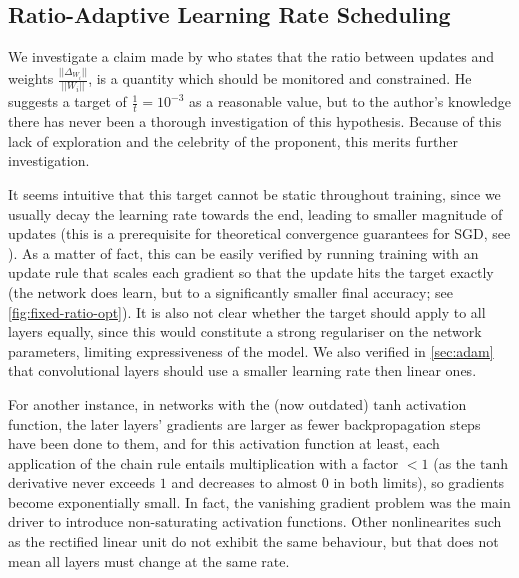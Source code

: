 \subsection{Ratio-Adaptive Learning Rate Scheduling}%
\label{sub:ratio_adaptive_learning_rate_scheduling}

We investigate a claim made by \citet{karpathycs231n} who states that the ratio
between updates and weights $\frac{||\Delta_{W_i}||}{||W_i||}$, is a quantity which should
be monitored and constrained. He suggests a target of $\frac{1}{t} = 10^{-3}$ as
a reasonable value, but to the author's knowledge there has never been a
thorough investigation of this hypothesis. Because of this lack of exploration
and the celebrity of the proponent, this merits further investigation.

It seems intuitive that this target cannot be static throughout training, since
we usually decay the learning rate towards the end, leading to smaller magnitude
of updates (this is a prerequisite for theoretical convergence guarantees for
SGD, see \citet[p. 20]{saad1998online}). As a matter of fact, this can be easily
verified by running training with an update rule that scales each gradient so
that the update hits the target exactly (the network does learn, but to a significantly
smaller final accuracy; see \cref{fig:fixed-ratio-opt}). It is also not clear
whether the target should apply to all layers equally, since this would
constitute a strong regulariser on the network parameters, limiting
expressiveness of the model. We also verified in \cref{sec:adam} that
convolutional layers should use a smaller learning rate then linear ones.

For another instance, in networks with the (now outdated)
$\text{tanh}$ activation function, the later layers' gradients are larger as
fewer backpropagation steps have been done to them, and for this activation
function at least, each application of the chain rule entails multiplication
with a factor $< 1$ (as the $\text{tanh}$ derivative never exceeds $1$ and decreases to
almost $0$ in both limits), so gradients become exponentially small. In fact,
the vanishing gradient problem was the main driver to introduce non-saturating
activation functions.  Other nonlinearites such as the rectified linear unit do
not exhibit the same behaviour, but that does not mean all layers must change at
the same rate.

